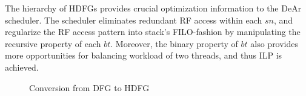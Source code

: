 \indent The hierarchy of HDFGs provides crucial optimization information to the DeAr scheduler.
The scheduler eliminates redundant RF access within each $sn$, and regularize the RF access pattern into stack's FILO-fashion by manipulating the recursive property of each $bt$.
Moreover, the binary property of $bt$ also provides more opportunities for balancing workload of two threads, and thus ILP is achieved.
\vspace{\textfig}
\begin{figure}[!ht]
    \begin{center}
        \hfill
    \end{center}
    \caption{Conversion from DFG to HDFG}
    \label{fig:dfg}
\end{figure}


